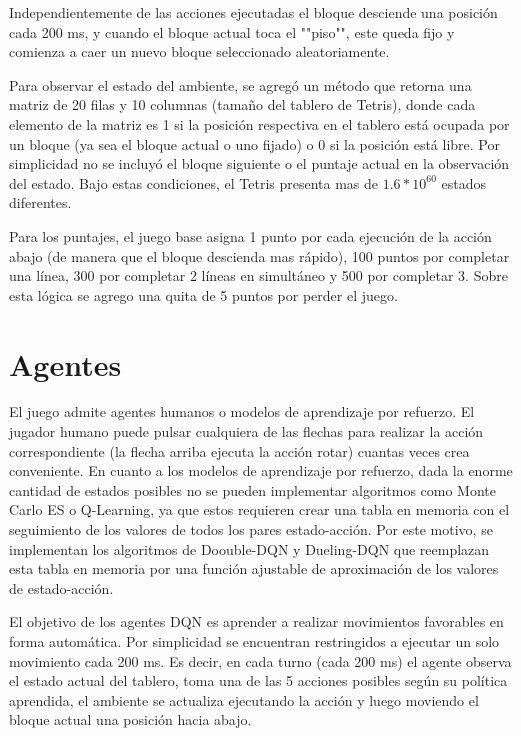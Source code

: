 Independientemente de las acciones ejecutadas el bloque desciende una posición cada 200 ms, y cuando el bloque actual toca el ""piso"", este queda fijo y comienza a caer un nuevo bloque seleccionado aleatoriamente.

Para observar el estado del ambiente, se agregó un método que retorna una matriz de 20 filas y 10 columnas (tamaño del tablero de Tetris), donde cada elemento de la matriz es 1 si la posición respectiva en el tablero está ocupada por un bloque (ya sea el bloque actual o uno fijado) o 0 si la posición está libre. Por simplicidad no se incluyó el bloque siguiente o el puntaje actual en la observación del estado. Bajo estas condiciones, el Tetris presenta mas de \(1.6*10^{60}\) estados diferentes.

Para los puntajes, el juego base asigna 1 punto por cada ejecución de la acción abajo (de manera que el bloque descienda mas rápido), 100 puntos por completar una línea, 300 por completar 2 líneas en simultáneo y 500 por completar 3. Sobre esta lógica se agrego una quita de 5 puntos por perder el juego.

\section{Agentes}
\label{sec:agentes}

El juego admite agentes humanos o modelos de aprendizaje por refuerzo. El jugador humano puede pulsar cualquiera de las flechas para realizar la acción correspondiente (la flecha arriba ejecuta la acción rotar) cuantas veces crea conveniente. En cuanto a los modelos de aprendizaje por refuerzo, dada la enorme cantidad de estados posibles no se pueden implementar algoritmos como Monte Carlo ES o Q-Learning, ya que estos requieren crear una tabla en memoria con el seguimiento de los valores de todos los pares estado-acción. Por este motivo, se implementan los algoritmos de Doouble-DQN y Dueling-DQN que reemplazan esta tabla en memoria por una función ajustable de aproximación de los valores de estado-acción. 

El objetivo de los agentes DQN es aprender a realizar movimientos favorables en forma automática. Por simplicidad se encuentran restringidos a ejecutar un solo movimiento cada 200 ms. Es decir, en cada turno (cada 200 ms) el agente observa el estado actual del tablero, toma una de las 5 acciones posibles según su política aprendida, el ambiente se actualiza ejecutando la acción y luego moviendo el bloque actual una posición hacia abajo.

